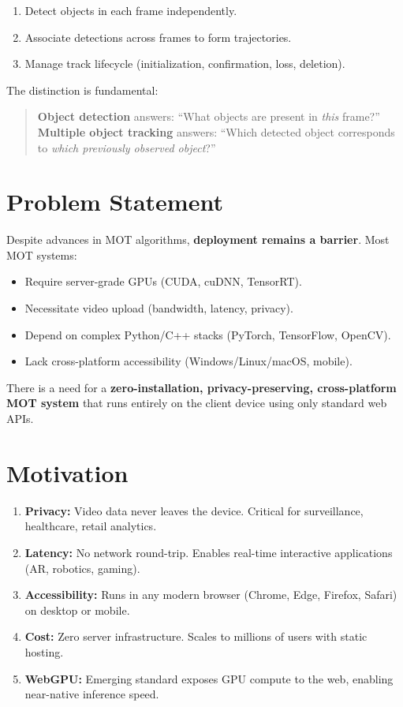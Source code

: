 \begin{enumerate}
    \item Detect objects in each frame independently.
    \item Associate detections across frames to form trajectories.
    \item Manage track lifecycle (initialization, confirmation, loss, deletion).
\end{enumerate}

The distinction is fundamental:
\begin{quote}
\textbf{Object detection} answers: ``What objects are present in \textit{this} frame?'' \\
\textbf{Multiple object tracking} answers: ``Which detected object corresponds to \textit{which previously observed object}?''
\end{quote}

\section{Problem Statement}
\label{sec:problem}

Despite advances in MOT algorithms, \textbf{deployment remains a barrier}. Most MOT systems:
\begin{itemize}
    \item Require server-grade GPUs (CUDA, cuDNN, TensorRT).
    \item Necessitate video upload (bandwidth, latency, privacy).
    \item Depend on complex Python/C++ stacks (PyTorch, TensorFlow, OpenCV).
    \item Lack cross-platform accessibility (Windows/Linux/macOS, mobile).
\end{itemize}

There is a need for a \textbf{zero-installation, privacy-preserving, cross-platform MOT system} that runs entirely on the client device using only standard web APIs.

\section{Motivation}
\label{sec:motivation}

\begin{enumerate}
    \item \textbf{Privacy:} Video data never leaves the device. Critical for surveillance, healthcare, retail analytics.
    \item \textbf{Latency:} No network round-trip. Enables real-time interactive applications (AR, robotics, gaming).
    \item \textbf{Accessibility:} Runs in any modern browser (Chrome, Edge, Firefox, Safari) on desktop or mobile.
    \item \textbf{Cost:} Zero server infrastructure. Scales to millions of users with static hosting.
    \item \textbf{WebGPU:} Emerging standard exposes GPU compute to the web, enabling near-native inference speed.
\end{enumerate}

